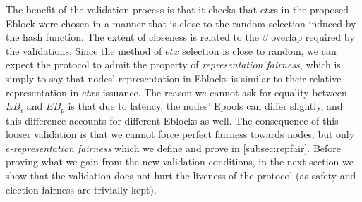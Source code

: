 


The benefit of the validation process is that it checks that $etx$s in the proposed Eblock were chosen in a manner that is close to the random selection induced by the hash function. The extent of closeness is related to the $\beta$ overlap required by the validations. Since the method of $etx$ selection is close to random, we can expect the protocol to admit the property of \textit{representation fairness}, which is simply to say that nodes' representation in Eblocks is similar to their relative representation in $etx$s issuance. The reason we cannot ask for equality between $EB_i$ and $EB_p$ is that due to latency, the nodes' Epools can differ slightly, and this difference accounts for different Eblocks as well. The consequence of this looser validation is that we cannot force perfect fairness towards nodes, but only $\epsilon$\textit{-representation fairness} which we define and prove in \ref{subsec:repfair}.
Before proving what we gain from the new validation conditions, in the next section we show that the validation does not hurt the liveness of the protocol (as safety and election fairness are trivially kept).










